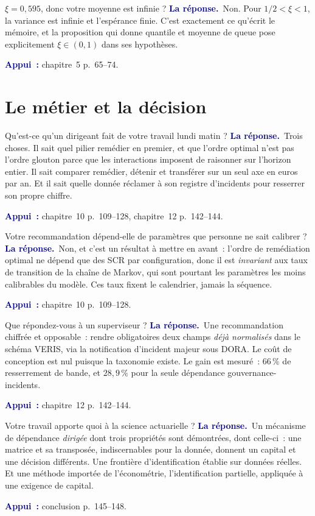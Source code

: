 \documentclass[11pt,a4paper]{article}
\newcommand{\rep}[1]{\smallskip\noindent\textcolor{navy}{\textbf{La réponse.}}\ #1\par}
\newcommand{\appui}[1]{\smallskip\noindent\small\textcolor{navy}{\textbf{Appui~:}} #1\par\normalsize}
\begin{document}
\begin{question}{\og $\xi=0{,}595$, donc votre moyenne est infinie ?\fg{}}
\rep{Non. Pour $1/2<\xi<1$, la variance est infinie et l'espérance finie. C'est exactement ce
qu'écrit le mémoire, et la proposition qui donne quantile et moyenne de queue pose explicitement
$\xi\in(0,1)$ dans ses hypothèses.}
\appui{chapitre~5 p.~65--74.}
\end{question}

\section{Le métier et la décision}

\begin{question}{\og Qu'est-ce qu'un dirigeant fait de votre travail lundi matin ?\fg{}}
\rep{Trois choses. Il sait quel pilier remédier en premier, et que l'ordre optimal n'est pas
l'ordre glouton parce que les interactions imposent de raisonner sur l'horizon entier. Il sait
comparer remédier, détenir et transférer sur un seul axe en euros par an. Et il sait quelle
donnée réclamer à son registre d'incidents pour resserrer son propre chiffre.}
\appui{chapitre~10 p.~109--128, chapitre~12 p.~142--144.}
\end{question}

\begin{question}{\og Votre recommandation dépend-elle de paramètres que personne ne sait calibrer ?\fg{}}
\rep{Non, et c'est un résultat à mettre en avant~: l'ordre de remédiation optimal ne dépend que
des SCR par configuration, donc il est \emph{invariant} aux taux de transition de la chaîne de
Markov, qui sont pourtant les paramètres les moins calibrables du modèle. Ces taux fixent le
calendrier, jamais la séquence.}
\appui{chapitre~10 p.~109--128.}
\end{question}

\begin{question}{\og Que répondez-vous à un superviseur ?\fg{}}
\rep{Une recommandation chiffrée et opposable~: rendre obligatoires deux champs \emph{déjà
normalisés} dans le schéma VERIS, via la notification d'incident majeur sous DORA. Le coût de
conception est nul puisque la taxonomie existe. Le gain est mesuré~: $66\,\%$ de resserrement de
bande, et $28{,}9\,\%$ pour la seule dépendance gouvernance-incidents.}
\appui{chapitre~12 p.~142--144.}
\end{question}

\begin{question}{\og Votre travail apporte quoi à la science actuarielle ?\fg{}}
\rep{Un mécanisme de dépendance \emph{dirigée} dont trois propriétés sont démontrées, dont
celle-ci~: une matrice et sa transposée, indiscernables pour la donnée, donnent un capital et une
décision différents. Une frontière d'identification établie sur données réelles. Et une méthode
importée de l'économétrie, l'identification partielle, appliquée à une exigence de capital.}
\appui{conclusion p.~145--148.}
\end{question}
\end{document}
